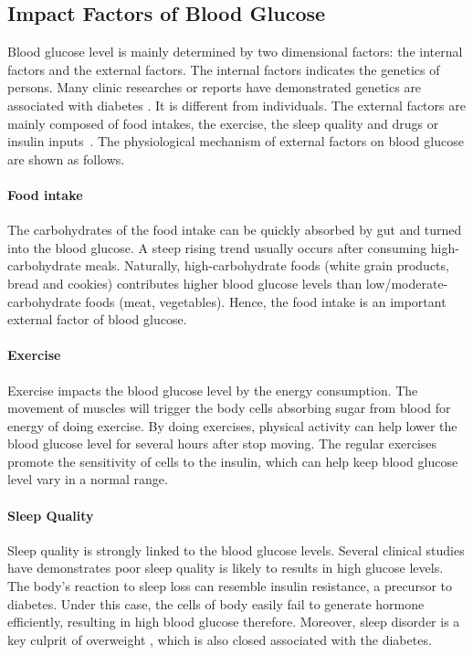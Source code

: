 \subsection{Impact Factors of Blood Glucose}
 Blood glucose level is mainly determined by two dimensional factors:  the internal factors and the external factors. The internal factors indicates the genetics of persons. Many clinic researches or reports have demonstrated genetics are associated with diabetes \cite{bib:simpson1978genetics,bib:diabetes_co_uk,bib:rotter1984genetics,bib:concannon2009genetics,bib:salopuro2004common}.
 It is different from individuals. The external factors are mainly composed of food intakes, the exercise, the sleep quality and drugs or insulin inputs~\cite{bib:duke2010intelligent}. The physiological mechanism of external factors on blood glucose are shown as follows.

\paragraph{Food intake} The carbohydrates of the food intake can be quickly absorbed by gut and turned into the blood glucose. A steep rising trend usually occurs after consuming high-carbohydrate meals. Naturally, high-carbohydrate foods (\eg white grain products, bread and cookies) contributes higher blood glucose levels than low/moderate-carbohydrate foods (\eg meat, vegetables).
Hence, the food intake is an important external factor of blood glucose.
\paragraph{Exercise} Exercise impacts the blood glucose level by the energy consumption. The movement of muscles will trigger the body cells absorbing sugar from blood for energy of doing exercise.  By doing exercises, physical activity can help lower the blood glucose level for several hours after stop moving. The regular exercises promote the sensitivity of cells to the insulin, which can help keep blood glucose level vary in a normal range. 

\paragraph{Sleep Quality} Sleep quality is strongly linked to the blood glucose levels. Several clinical studies \cite{bib:scheen1998roles,bib:scheen1996relationships,bib:spiegel2005sleep} have demonstrates poor sleep quality is likely to results in high glucose levels. The body's reaction to sleep loss can resemble insulin resistance, a precursor to diabetes. Under this case, the cells of body easily fail to generate hormone efficiently, resulting in high blood glucose therefore. Moreover, sleep disorder is a key culprit of overweight \cite{bib:punjabi2002sleep, bib:knutson2006role}, which is also closed associated with the diabetes.

